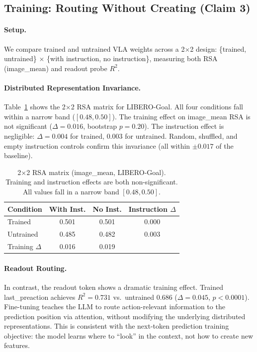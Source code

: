 \documentclass[letterpaper]{article}
\begin{document}
\subsection{Training: Routing Without Creating (Claim 3)}
\label{sec:exp-training}

\paragraph{Setup.}
We compare trained and untrained VLA weights across a 2$\times$2 design: \{trained, untrained\} $\times$ \{with instruction, no instruction\}, measuring both RSA (image\_mean) and readout probe $R^2$.

\paragraph{Distributed Representation Invariance.}
Table~\ref{tab:2x2-goal} shows the 2$\times$2 RSA matrix for LIBERO-Goal.
All four conditions fall within a narrow band ($[0.48, 0.50]$).
The training effect on image\_mean RSA is not significant ($\Delta{=}0.016$, bootstrap $p{=}0.20$).
The instruction effect is negligible: $\Delta{=}0.004$ for trained, $0.003$ for untrained.
Random, shuffled, and empty instruction controls confirm this invariance (all within $\pm 0.017$ of the baseline).

\begin{table}[t]
\centering
\caption{2$\times$2 RSA matrix (image\_mean, LIBERO-Goal). Training and instruction effects are both non-significant. All values fall in a narrow band $[0.48, 0.50]$.}
\label{tab:2x2-goal}
\begin{tabular}{@{}lccc@{}}
\toprule
Condition & With Inst. & No Inst. & Instruction $\Delta$ \\
\midrule
Trained   & 0.501 & 0.501 & 0.000 \\
Untrained & 0.485 & 0.482 & 0.003 \\
\midrule
Training $\Delta$ & 0.016 & 0.019 & \\
\bottomrule
\end{tabular}
\end{table}

\paragraph{Readout Routing.}
In contrast, the readout token shows a dramatic training effect.
Trained last\_preaction achieves $R^2{=}0.731$ vs.\ untrained $0.686$ ($\Delta{=}0.045$, $p{<}0.0001$).
Fine-tuning teaches the LLM to route action-relevant information to the prediction position via attention, without modifying the underlying distributed representations.
This is consistent with the next-token prediction training objective: the model learns where to ``look'' in the context, not how to create new features.
\end{document}
